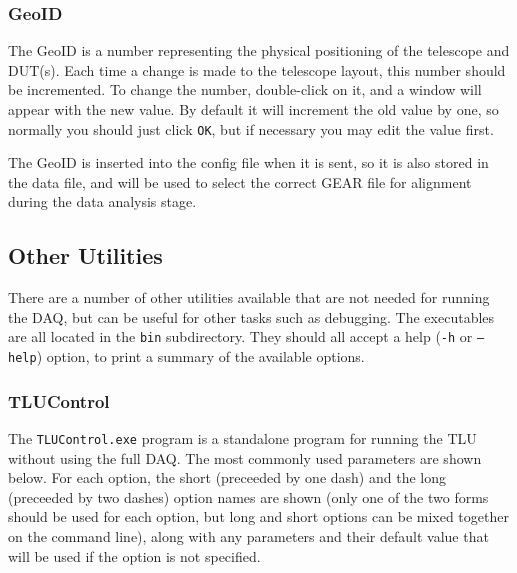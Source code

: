 \subsubsection{GeoID}\label{sec:GeoID}
The GeoID is a number representing the physical positioning of the telescope and DUT(s).
Each time a change is made to the telescope layout, this number should be incremented.
To change the number, double-click on it, and a window will appear with the new value.
By default it will increment the old value by one, so normally you should just click \texttt{OK},
but if necessary you may edit the value first.

The GeoID is inserted into the config file when it is sent, so it is also stored in the data file,
and will be used to select the correct GEAR file for alignment during the data analysis stage.

\subsection{Other Utilities}
There are a number of other utilities available that are not needed for running the DAQ,
but can be useful for other tasks such as debugging.
The executables are all located in the \texttt{bin} subdirectory.
They should all accept a help (\texttt{-h} or \texttt{--help}) option,
to print a summary of the available options.

\subsubsection{TLUControl}
The \texttt{TLUControl.exe} program is a standalone program for running the TLU without using the
full DAQ. The most commonly used parameters are shown below. For each option, the short (preceeded
by one dash) and the long (preceeded by two dashes) option names are shown (only one of the two
forms should be used for each option, but long and short options can be mixed together on the
command line), along with any parameters and their default value that will be used if the option is
not specified.

